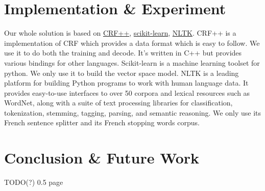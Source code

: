 \documentclass[a4paper]{article}
\begin{document}
\section{Implementation \& Experiment}
Our whole solution is based on \href{http://crfpp.googlecode.com/svn/trunk/doc/index.html}{CRF++}, \href{http://scikit-learn.org/stable/}{scikit-learn}, \href{http://nltk.org/}{NLTK}. CRF++ is a implementation of CRF which provides a data format which is easy to follow. We use it to do both the training and decode. It's written in C++ but provides various bindings for other languages. Scikit-learn is a machine learning toolset for python. We only use it to build the vector space model. NLTK is a leading platform for building Python programs to work with human language data. It provides easy-to-use interfaces to over 50 corpora and lexical resources such as WordNet, along with a suite of text processing libraries for classification, tokenization, stemming, tagging, parsing, and semantic reasoning. We only use its French sentence splitter and its French stopping words corpus.

\section{Conclusion \& Future Work}
TODO(?)
0.5 page
%
\end{document}
